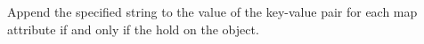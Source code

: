 Append the specified string to the value of the key-value pair for each map
attribute if and only if the  hold on the object.



